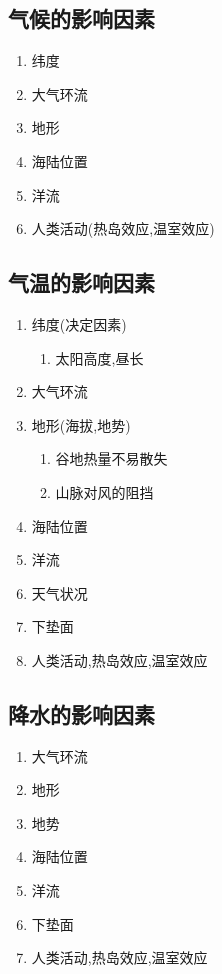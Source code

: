 \documentclass[a4paper]{article}
\begin{document}
    \subsection{气候的影响因素}
    \begin{enumerate}
        \item 纬度
        \item 大气环流
        \item 地形
        \item 海陆位置
        \item 洋流
        \item 人类活动(热岛效应,温室效应)
    \end{enumerate}
    \subsection{气温的影响因素}
    \begin{enumerate}
        \item 纬度(决定因素)
        \begin{enumerate}
            \item 太阳高度,昼长
        \end{enumerate}
        \item 大气环流
        \item 地形(海拔,地势)
        \begin{enumerate}
            \item 谷地热量不易散失
            \item 山脉对风的阻挡
        \end{enumerate}
        \item 海陆位置
        \item 洋流
        \item 天气状况
        \item 下垫面
        \item 人类活动,热岛效应,温室效应
    \end{enumerate}
    \subsection{降水的影响因素}
    \begin{enumerate}
        \item 大气环流
        \item 地形
        \item 地势
        \item 海陆位置
        \item 洋流
        \item 下垫面
        \item 人类活动,热岛效应,温室效应
    \end{enumerate}
\end{document}
